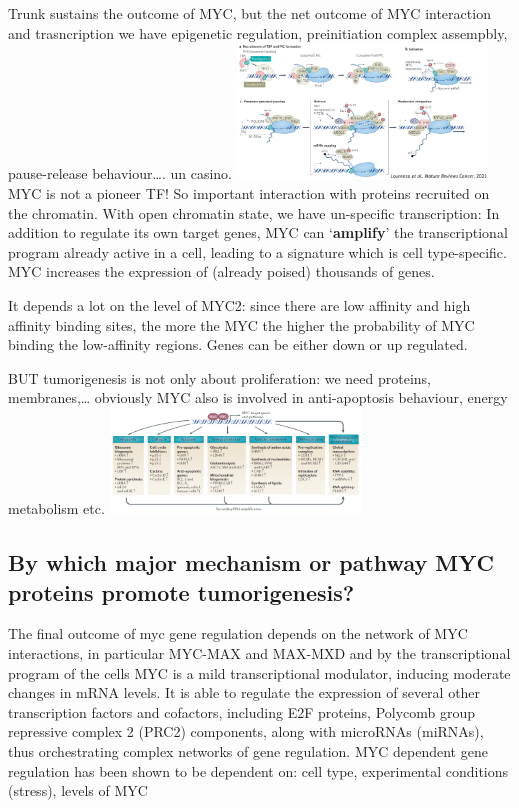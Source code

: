 Trunk sustains the outcome of MYC, but the net outcome of MYC interaction and trasncription we have epigenetic regulation, preinitiation complex assempbly, pause-release behaviour\ldots. un casino.
\includegraphics[width=0.5\textwidth]{../_resources/10a2ad3114504053030a1071443aabd7.png}
MYC is not a pioneer TF! So important interaction with proteins recruited on the chromatin.
With open chromatin state, we have un-specific transcription: In addition to regulate its own target genes, MYC can `\textbf{amplify}' the transcriptional program already active in a cell, leading to a signature which is cell type-specific. MYC increases the expression of (already poised) thousands of genes.

It depends a lot on the level of MYC2: since there are low affinity and high affinity binding sites, the more the MYC the higher the probability of MYC binding the low-affinity regions. Genes can be either down or up regulated.

BUT tumorigenesis is not only about proliferation: we need proteins, membranes,\ldots{} obviously MYC also is involved in anti-apoptosis behaviour, energy metabolism etc.
\includegraphics[width=0.5\textwidth]{../_resources/cdb9692b7dd2ca7bcfae696cd1b1ce36.png}

\hypertarget{by-which-major-mechanism-or-pathway-myc-proteins-promote-tumorigenesis}{%
\subsection{By which major mechanism or pathway MYC proteins promote tumorigenesis?}\label{by-which-major-mechanism-or-pathway-myc-proteins-promote-tumorigenesis}}

The final outcome of myc gene regulation depends on the network of MYC interactions, in particular MYC-MAX
and MAX-MXD and by the transcriptional program of the cells
MYC is a mild transcriptional modulator, inducing moderate changes in mRNA levels.
It is able to regulate the expression of several other transcription factors and cofactors, including E2F proteins,
Polycomb group repressive complex 2 (PRC2) components, along with microRNAs (miRNAs), thus orchestrating
complex networks of gene regulation.
MYC dependent gene regulation has been shown to be dependent on: cell type, experimental conditions (stress),
levels of MYC

